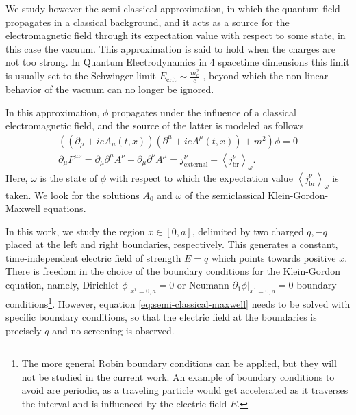 We study however the semi-classical approximation, in which the quantum field propagates in a classical background, and it acts as a source for the electromagnetic field through its expectation value with respect to some state, in this case the vacuum. This approximation is said to hold when the charges are not too strong. In Quantum Electrodynamics in 4 spacetime  dimensions this limit is usually set to the Schwinger limit $E_\text{crit} \sim \frac{m_e^2}{e}$ \cite{Schw51}, beyond which the non-linear behavior of the vacuum can no longer be ignored.

In this approximation, $\phi$ propagates under the influence of a classical electromagnetic field, and the source of the latter is modeled as follows
\begin{subequations}
\begin{align}
            ((\partial_\mu + ieA_\mu(t, x)) (\partial^\mu + ieA^\mu(t, x)) + m^2)\phi = 0 \\
			\partial_\mu F^{\mu\nu}= \partial_\mu \partial^\mu A^\nu -  \partial_\mu \partial^\nu A^\mu  = j_{\text{external}}^{\nu} + \left<j_\text{br}^{\nu} \right>_\omega.
			\label{eq:semi-classical-maxwell}
\end{align}
\end{subequations}
Here, $\omega$ is the state of $\phi$ with respect to which the expectation value $\left<j_\text{br}^{\nu} \right>_\omega$ is taken.
We look for the solutions $A_0$ and $\omega$ of the semiclassical Klein-Gordon-Maxwell equations. 

In this work, we study the region $x\in[0,a]$, delimited by two charged $q, -q$ placed at the left and right boundaries, respectively. This generates a constant, time-independent electric field of strength $E=q$ which points towards positive $x$.
There is freedom in the choice of the boundary conditions for the Klein-Gordon equation, namely, Dirichlet $\left. \phi\right|_{x^1 = 0, a}=0$  or Neumann $\left. \partial_{1}\phi\right|_{x^1 = 0, a}=0$ boundary conditions\footnote{The more general Robin boundary conditions can be applied, but they will not be studied in the current work. An example of boundary conditions to avoid are periodic, as a traveling particle would get accelerated as it traverses the interval and is influenced by the electric field $E$.}. However, equation \eqref{eq:semi-classical-maxwell} needs to be solved with specific boundary conditions, so that the electric field at the boundaries is precisely $q$ and no screening is observed.

